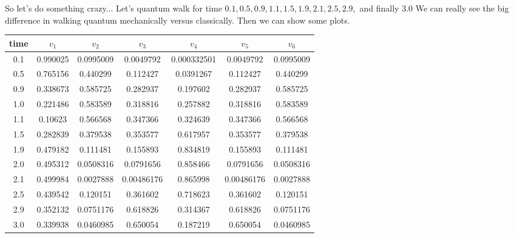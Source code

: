 \documentclass{article}
\theoremstyle{definition}
\theoremstyle{remark}
\begin{document}
So let's do something crazy... Let's quantum walk for time $0.1, 0.5, 0.9, 1.1, 1.5, 1.9, 2.1, 2.5, 2.9,$ and finally $3.0$ We can really see the big difference in walking quantum mechanically versus classically. Then we can show some plots.

\begin{tabular}{c | c | c | c | c | c | c }
time & $v_1$ & $v_2$ & $v_3$ & $v_4$ & $v_5$ & $v_6$\\ 
\hline
0.1 & 0.990025 & 0.0995009 & 0.0049792 &  0.000332501 & 0.0049792  & 0.0995009\\
0.5 & 0.765156 & 0.440299  & 0.112427  &  0.0391267   & 0.112427   & 0.440299\\
0.9 & 0.338673 & 0.585725  & 0.282937  &  0.197602    & 0.282937   & 0.585725\\
1.0 & 0.221486 & 0.583589  & 0.318816  &  0.257882    & 0.318816   & 0.583589\\
1.1 & 0.10623  & 0.566568  & 0.347366  &  0.324639    & 0.347366   & 0.566568\\
1.5 & 0.282839 & 0.379538  & 0.353577  &  0.617957    & 0.353577   & 0.379538\\
1.9 & 0.479182 & 0.111481  & 0.155893  &  0.834819    & 0.155893   & 0.111481\\
2.0 & 0.495312 & 0.0508316 & 0.0791656 &  0.858466    & 0.0791656  & 0.0508316\\
2.1 & 0.499984 & 0.0027888 & 0.00486176&  0.865998    & 0.00486176 & 0.0027888\\
2.5 & 0.439542 & 0.120151  & 0.361602  &  0.718623    & 0.361602   & 0.120151\\
2.9 & 0.352132 & 0.0751176 & 0.618826  &  0.314367    & 0.618826   & 0.0751176\\
3.0 & 0.339938 & 0.0460985 & 0.650054  &  0.187219    & 0.650054   & 0.0460985\\
\end{tabular}


\end{document}
